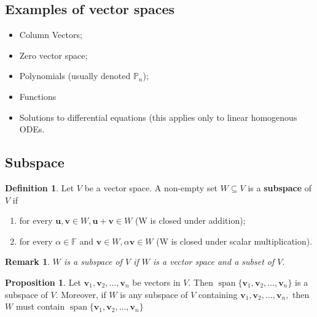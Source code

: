 \documentclass[12pt, a4paper]{article}
\newtheorem*{remark}{Remark}
\theoremstyle{definition}
\newtheorem{definition}{Definition}[section]
\newtheorem{proposition}{Proposition}
\theoremstyle{plain}
\newcommand{\bb}[1]{\mathbb{#1}}
\newcommand{\vect}[1]{\mathbf{#1}}
\DeclareMathOperator{\Span}{span}
\begin{document}
\subsection*{Examples of vector spaces}

\begin{itemize}
	
	\item Column Vectors;

	\item Zero vector space;

	\item Polynomials (usually denoted $\bb{P}_n$);

	\item Functions 

	\item Solutions to differential equations (this applies only to linear homogenous ODEs.

\end{itemize}

\subsection{Subspace}

\begin{definition} Let $V$ be a vector space. A non-empty set $W \subseteq V$ is a \textbf{subspace} of $V$ if 

\begin{enumerate}
	
	\item for every $\vect{u,v}\in W, \vect{u+v} \in W$ (W is closed under addition);

	\item for every $\alpha \in \bb{F}$ and $\vect{v} \in W, \alpha\vect{v} \in W$ (W is closed under scalar multiplication).

\end{enumerate}

\end{definition}

\begin{remark}
$W$ is a subspace of $V$ if $W$ is a vector space and a subset of $V.$
\end{remark} 

\begin{proposition} Let $\vect{v}_1,\vect{v}_2,\ldots,\vect{v}_n$ be vectors in $V.$ Then $\Span\{\vect{v}_1,\vect{v}_2,\ldots,\vect{v}_n\}$ is a subspace of $V.$ Moreover, if $W$ is any subspace of $V$ containing $\vect{v}_1,\vect{v}_2,\ldots,\vect{v}_n,$ then $W$ must contain $\Span\{\vect{v}_1,\vect{v}_2,\ldots,\vect{v}_n\}$ \end{proposition}
\end{document}

